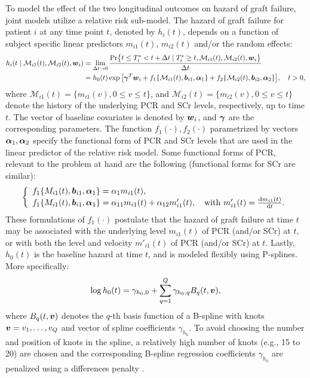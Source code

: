 To model the effect of the two longitudinal outcomes on hazard of graft failure, joint models utilize a relative risk sub-model. The hazard of graft failure for patient $i$ at any time point $t$, denoted by $h_i(t)$, depends on a function of subject specific linear predictors $m_{i1}(t)$, $m_{i2}(t)$ and/or the random effects:
\begin{align*}
h_i(t \mid \mathcal{M}_{i1}(t), \mathcal{M}_{i2}(t), \boldsymbol{w}_i) &= \lim_{\Delta t \to 0} \frac{\mbox{Pr}\big\{t \leq T^*_i < t + \Delta t \mid T^*_i \geq t, \mathcal{M}_{i1}(t), \mathcal{M}_{i2}(t), \boldsymbol{w}_i\big\}}{\Delta t}\\
&=h_0(t) \exp\big[\boldsymbol{\gamma}^T\boldsymbol{w}_i + f_1\{\mathcal{M}_{i1}(t), \boldsymbol{b}_{i1}, \boldsymbol{\alpha}_1\} + f_2\{\mathcal{M}_{i2}(t), \boldsymbol{b}_{i2}, \boldsymbol{\alpha}_2\}\big], \quad t>0,
\end{align*}
where $\mathcal{M}_{i1}(t) = \{m_{i1}(v), 0\leq v \leq t\}$, and $\mathcal{M}_{i2}(t) = \{m_{i2}(v), 0\leq v \leq t\}$ denote the history of the underlying PCR and SCr levels, respectively, up to time $t$. The vector of baseline covariates is denoted by $\boldsymbol{w}_i$, and $\boldsymbol{\gamma}$ are the corresponding parameters. The function $f_1(\cdot), f_2(\cdot)$ parametrized by vectors $\boldsymbol{\alpha}_1, \boldsymbol{\alpha}_2$ specify the functional form of PCR and SCr levels \citep{brown2009assessing,rizopoulos2012joint,taylor2013real,rizopoulos2014bma} that are used in the linear predictor of the relative risk model. Some functional forms of PCR, relevant to the problem at hand are the following (functional forms for SCr are similar): 
\begin{eqnarray*}
\left \{
\begin{array}{l}
f_1\{M_{i1}(t), \boldsymbol{b}_{i1}, \boldsymbol{\alpha}_1\} = \alpha_1 m_{i1}(t),\\
f_1\{M_{i1}(t), \boldsymbol{b}_{i1}, \boldsymbol{\alpha}_1\} = \alpha_{11} m_{i1}(t) + \alpha_{12} m'_{i1}(t),\quad \text{with}\  m'_{i1}(t) = \frac{\mathrm{d}{m_{i1}(t)}}{\mathrm{d}{t}}.\\
\end{array}
\right.
\end{eqnarray*}
These formulations of $f_1(\cdot)$ postulate that the hazard of graft failure at time $t$ may be associated with the underlying level $m_{i1}(t)$ of PCR (and/or SCr) at $t$, or with both the level and velocity $m'_{i1}(t)$ of PCR (and/or SCr) at $t$. Lastly, $h_0(t)$ is the baseline hazard at time $t$, and is modeled flexibly using P-splines. More specifically:
\begin{equation*}
\log{h_0(t)} = \gamma_{h_0,0} + \sum_{q=1}^Q \gamma_{h_0,q} B_q(t, \boldsymbol{v}),
\end{equation*}
where $B_q(t, \boldsymbol{v})$ denotes the $q$-th basis function of a B-spline with knots $\boldsymbol{v} = v_1, \ldots, v_Q$ and vector of spline coefficients $\gamma_{h_0}$. To avoid choosing the number and position of knots in the spline, a relatively high number of knots (e.g., 15 to 20) are chosen and the corresponding B-spline regression coefficients $\gamma_{h_0}$ are penalized using a differences penalty \citep{eilers1996flexible}. 

